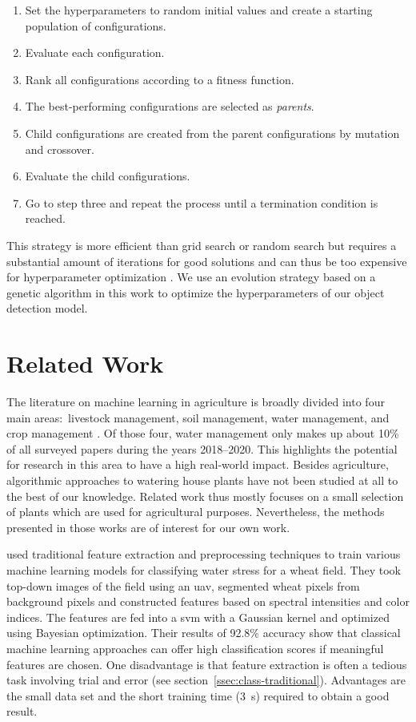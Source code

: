 \documentclass[final]{vutinfth} %
\begin{document}
\begin{enumerate}
\item Set the hyperparameters to random initial values and create a
  starting population of configurations.
\item Evaluate each configuration.
\item Rank all configurations according to a fitness function.
\item The best-performing configurations are selected as
  \emph{parents}.
\item Child configurations are created from the parent configurations
  by mutation and crossover.
\item Evaluate the child configurations.
\item Go to step three and repeat the process until a termination
  condition is reached.
\end{enumerate}

This strategy is more efficient than grid search or random search but
requires a substantial amount of iterations for good solutions and can
thus be too expensive for hyperparameter optimization
\cite{bischl2023}. We use an evolution strategy based on a genetic
algorithm in this work to optimize the hyperparameters of our object
detection model.

\section{Related Work}
\label{sec:related-work}

The literature on machine learning in agriculture is broadly divided
into four main areas:~livestock management, soil management, water
management, and crop management \cite{benos2021}. Of those four, water
management only makes up about 10\% of all surveyed papers during the
years 2018--2020. This highlights the potential for research in this
area to have a high real-world impact. Besides agriculture,
algorithmic approaches to watering house plants have not been studied
at all to the best of our knowledge. Related work thus mostly focuses
on a small selection of plants which are used for agricultural
purposes. Nevertheless, the methods presented in those works are of
interest for our own work.

\textcite{su2020} used traditional feature extraction and
preprocessing techniques to train various machine learning models for
classifying water stress for a wheat field. They took top-down images
of the field using an \gls{uav}, segmented wheat pixels from
background pixels and constructed features based on spectral
intensities and color indices. The features are fed into a \gls{svm}
with a Gaussian kernel and optimized using Bayesian
optimization. Their results of 92.8\% accuracy show that classical
machine learning approaches can offer high classification scores if
meaningful features are chosen. One disadvantage is that feature
extraction is often a tedious task involving trial and error (see
section~\ref{ssec:class-traditional}). Advantages are the small data
set and the short training time (\qty{3}{\s}) required to obtain a
good result.
\end{document}
